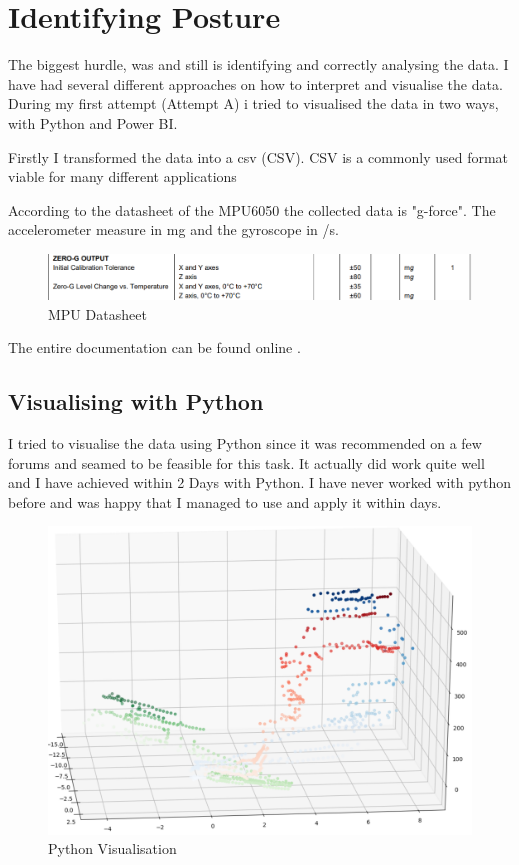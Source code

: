 \section{Identifying Posture}

The biggest hurdle, was and still is identifying and correctly analysing the data. I have had several different approaches on how to interpret and visualise the data. During my first attempt (Attempt A) i tried to visualised the data in two ways, with Python and Power BI.

Firstly I transformed the data into a \acrshort{csv} (\gls{CSV}). CSV is a commonly used format viable for many different applications

According to the datasheet of the MPU6050 the collected data is "g-force". The accelerometer measure in mg and the gyroscope in \degree/s. 

\begin{figure}[h]
\begin{center}
\includegraphics[width=\linewidth]{images/MPU6050_DATA.png}
  \end{center}
  \caption{MPU Datasheet}
  \label{fig:MPUDatasheet}
\end{figure}

The entire documentation can be found online \cite{MPU6000D59:online}.

\subsection{Visualising with Python}

I tried to visualise the data using \gls{Python} since it was recommended on a few forums and seamed to be feasible for this task. It actually did work quite well and I have achieved within 2 Days with Python. I have never worked with python before and was happy that I managed to use and apply it within days. 

\begin{figure}[h!]
\begin{center}
\includegraphics[width=0.6\linewidth]{images/PyVisualisation.png}
  \end{center}
  \caption{Python Visualisation}
  \label{fig:PythonVisualisation}
\end{figure}

